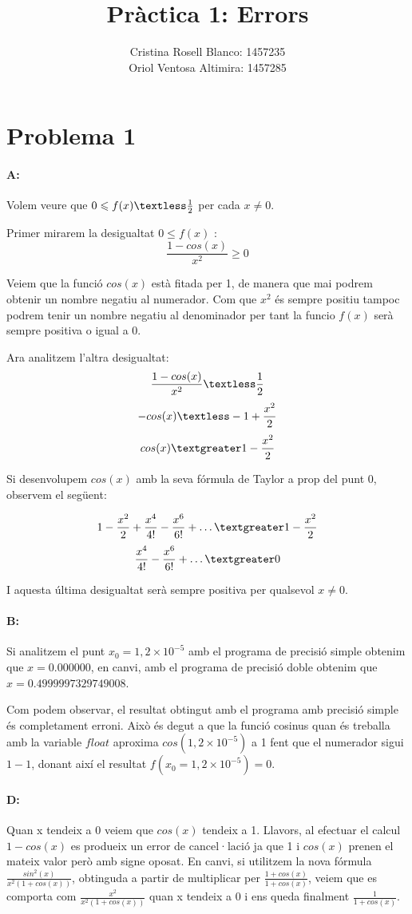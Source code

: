 \documentclass{article}
\title{Pràctica 1: Errors}
\author{Cristina Rosell Blanco: 1457235  \\ Oriol Ventosa Altimira: 1457285}
\begin{document}
	\maketitle
	
	\newpage

	\section{Problema 1}
	\paragraph{A:} Volem veure que $0\leqslant f(x) \textless \frac{1}{2}$ per cada $x\neq0$. 
	
	Primer mirarem la desigualtat $0\leqslant f(x)$ :
	$$\frac{1-cos(x)}{x^2} \geqslant 0$$
	
	Veiem que la funció $cos(x)$ està fitada per 1, de manera que mai podrem obtenir un nombre negatiu al numerador. Com que $x^2$ és sempre positiu tampoc podrem tenir un nombre negatiu al denominador per tant la funcio $f(x)$ serà sempre positiva o igual a 0.
	
	Ara analitzem l'altra desigualtat:
	$$\frac{1-cos(x)}{x^2} \textless \frac{1}{2}$$
	$$-cos(x) \textless -1+\frac{x^2}{2}$$
	$$cos(x) \textgreater 1-\frac{x^2}{2}$$	
	
	Si desenvolupem $cos(x)$ amb la seva fórmula de Taylor a prop del punt 0, observem el següent:
	
	$$1-\frac{x^2}{2}+\frac{x^4}{4!}-\frac{x^6}{6!}+\dots \textgreater 1-\frac{x^2}{2}$$
	$$\frac{x^4}{4!}-\frac{x^6}{6!}+\dots \textgreater 0$$
	
	I aquesta última desigualtat serà sempre positiva per qualsevol $x\neq0$.
	
	\paragraph{B:} Si analitzem el punt $x_0=1,2\times 10^{-5}$ amb el programa de precisió simple obtenim que $x=0.000000$, en canvi, amb el programa de precisió doble obtenim que $x=0.4999997329749008$. 
	
	Com podem observar, el resultat obtingut amb el programa amb precisió simple és completament erroni. Això és degut a que la funció cosinus quan és treballa amb la variable $float$ aproxima $cos(1,2\times 10^{-5})$ a 1 fent que el numerador sigui $1-1$, donant així el resultat $f(x_0=1,2\times 10^{-5})=0$.
	
	\paragraph{D:} Quan x tendeix a 0 veiem que $cos(x)$ tendeix a 1. Llavors, al efectuar el calcul $1-cos(x)$ es produeix un error de cancel·lació ja que 1 i $cos(x)$ prenen el mateix valor però amb signe oposat. En canvi, si utilitzem la nova fórmula $\frac{sin^2(x)}{x^2(1+cos(x))}$, obtinguda a partir de multiplicar per $\frac{1+cos(x)}{1+cos(x)}$, veiem que es comporta com $\frac{x^2}{x^2(1+cos(x))}$ quan x tendeix a 0 i ens queda finalment $\frac{1}{1+cos(x)}$. 
	
\end{document}
